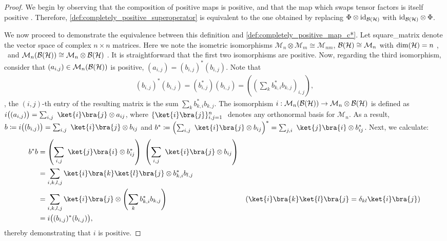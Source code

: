 \begin{proof}
  We begin by observing that the composition of positive maps is positive, and that the map which swaps tensor factors is itself positive \cite{watrous2018theory}. Therefore, \autoref{def:completely_positive_superoperator} is equivalent to the one obtained by replacing \( \Phi \otimes \mathrm{id}_{\mathcal{B}(\mathcal{H})} \) with \( \mathrm{id}_{\mathcal{B}(\mathcal{H})} \otimes \Phi \). 

 We now proceed to demonstrate the equivalence between this definition and \autoref{def:completely_positive_map_c*}. Let \gls{square_matrix} denote the vector space of complex $n \times n$ matrices.
 Here we note the isometric isomorphisms $\mathcal{M}_n \otimes \mathcal{M}_m \cong \mathcal{M}_{nm}$, $\mathcal{B}(\mathcal{H})\cong \mathcal{M}_{n}$ with $\text{dim}(\mathcal{H})=n$ \cite{watrous2018theory},  and $\mathcal{M}_n(\mathcal{B}(\mathcal{H}))\cong \mathcal{M}_n \otimes \mathcal{B}(\mathcal{H})$ \cite[Corollary 8.1.3]{effrosOperatorSpaces2000}. It is straightforward that the first two isomorphisms are positive. Now, regarding the third isomorphism, consider that $(a_{i,j}) \in \mathcal{M}_n(\mathcal{B}(\mathcal{H}))$ is positive, \ie $(a_{i,j}) = (b_{i,j})^* (b_{i,j}) $. Note that
  \begin{align*}
     (b_{i,j})^* (b_{i,j}) = (b_{i,j}^*) (b_{i,j}) = \left(  \left(\sum_k b_{k,i}^* b_{k,j} \right)_{i,j} \right),
  \end{align*}
\ie, the $(i,j)$-th entry of the resulting matrix is the sum $\sum_k b_{k,i}^* b_{k,j}$.
The isomorphism $i:\mathcal{M}_n(\mathcal{B}(\mathcal{H})) \to \mathcal{M}_n \otimes \mathcal{B}(\mathcal{H})$ is defined as $i\big((a_{i,j})\big) = \sum_{i,j}  \ket{i}\bra{j} \otimes a_{ij} $,
where $\{ \ket{i}\bra{j} \}_{i,j=1}^n  $ denotes any orthonormal basis for \( \mathcal{M}_n \).
As a result, $b \coloneqq i\big((b_{i,j})\big) = \sum_{i,j}  \ket{i}\bra{j} \otimes b_{ij}$ and $b^* \coloneqq \left(\sum_{i,j}  \ket{i}\bra{j} \otimes b_{ij}\right)^* = \sum_{j,i}  \ket{j}\bra{i} \otimes b_{ij}^*$.
Next, we calculate:
\begin{align*}
 b^*b &= \left( \sum_{i,j}  \ket{j}\bra{i} \otimes b_{ij}^* \right)  \left( \sum_{i,j}  \ket{i}\bra{j} \otimes b_{ij} \right) \\
 & = \sum_{i,k,l,j} \ket{i}\bra{k} \ket{l}\bra{j} \otimes b_{k,i}^* b_{l,j} \\
  & = \sum_{i,k,l,j} \ket{i}\bra{j} \otimes \left(\sum_{k} b_{k,i}^* b_{k,j}\right)  & ( \ket{i}\bra{k} \ket{l}\bra{j} = \delta_{kl} \ket{i}\bra{j}) \\
  & = i\big((b_{i,j})^* (b_{i,j})\big),
\end{align*} 
thereby demonstrating that $i$ is positive.


\end{proof}
